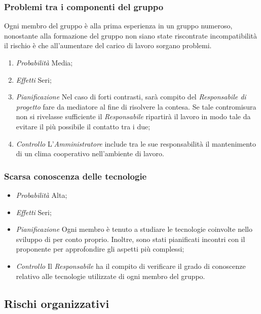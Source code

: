 		\subsubsection{Problemi tra i componenti del gruppo}

Ogni membro del gruppo è alla prima esperienza in un gruppo numeroso, nonostante alla formazione del gruppo non siano state riscontrate incompatibilità il rischio è che all'aumentare del carico di lavoro sorgano problemi.		
\begin{enumerate}
\item \textit{Probabilità} Media;
\item \textit{Effetti} Seri;
\item \textit{Pianificazione} Nel caso di forti contrasti, sarà compito del \textit{Responsabile di progetto} fare da mediatore al fine di risolvere la contesa. Se tale contromisura non si rivelasse sufficiente il \textit{Responsabile} ripartirà il lavoro in modo tale da evitare il più possibile il contatto tra i due;
\item \textit{Controllo} L'\textit{Amministratore} include tra le sue responsabilità il mantenimento di un clima cooperativo nell'ambiente di lavoro.
\end{enumerate}	
		
		\subsubsection{Scarsa conoscenza delle tecnologie}
		
\begin{itemize}
\item \textit{Probabilità} Alta;
\item \textit{Effetti} Seri;
\item \textit{Pianificazione} Ogni membro è tenuto a studiare le tecnologie coinvolte nello sviluppo di \ProjectName{} per conto proprio. Inoltre, sono stati pianificati incontri con il proponente per approfondire gli aspetti più complessi;
\item \textit{Controllo}  Il \textit{Responsabile} ha il compito di verificare il grado di conoscenze relativo alle tecnologie utilizzate di ogni membro del gruppo.
\end{itemize}	


	\subsection{Rischi organizzativi}
	
